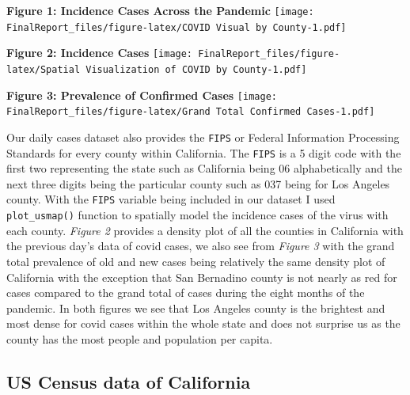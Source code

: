 \documentclass[
]{article}
\begin{document}
\textbf{Figure 1: Incidence Cases Across the Pandemic}
\texttt{[image: FinalReport\_files/figure-latex/COVID Visual by County-1.pdf]}

\textbf{Figure 2: Incidence Cases}
\texttt{[image: FinalReport\_files/figure-latex/Spatial Visualization of COVID by County-1.pdf]}

\textbf{Figure 3: Prevalence of Confirmed Cases}
\texttt{[image: FinalReport\_files/figure-latex/Grand Total Confirmed Cases-1.pdf]}

Our daily cases dataset also provides the \texttt{FIPS} or Federal
Information Processing Standards for every county within California. The
\texttt{FIPS} is a 5 digit code with the first two representing the
state such as California being 06 alphabetically and the next three
digits being the particular county such as 037 being for Los Angeles
county. With the \texttt{FIPS} variable being included in our dataset I
used \texttt{plot\_usmap()} function to spatially model the incidence
cases of the virus with each county. \emph{Figure 2} provides a density
plot of all the counties in California with the previous day's data of
covid cases, we also see from \emph{Figure 3} with the grand total
prevalence of old and new cases being relatively the same density plot
of California with the exception that San Bernadino county is not nearly
as red for cases compared to the grand total of cases during the eight
months of the pandemic. In both figures we see that Los Angeles county
is the brightest and most dense for covid cases within the whole state
and does not surprise us as the county has the most people and
population per capita.

\hypertarget{us-census-data-of-california}{%
\subsection{US Census data of
California}\label{us-census-data-of-california}}
\end{document}
